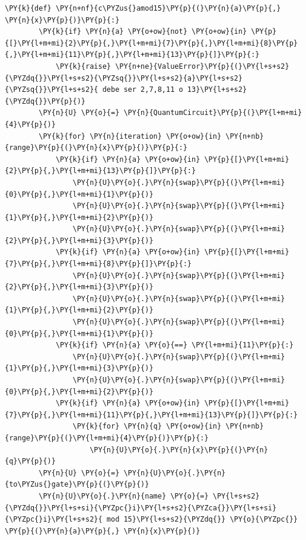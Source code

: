  \begin{tcolorbox}[breakable, size=fbox, boxrule=1pt, pad at break*=1mm,colback=cellbackground, colframe=cellborder]
    \begin{Verbatim}[commandchars=\\\{\}]
    \PY{k}{def} \PY{n+nf}{c\PYZus{}amod15}\PY{p}{(}\PY{n}{a}\PY{p}{,} \PY{n}{x}\PY{p}{)}\PY{p}{:}
        \PY{k}{if} \PY{n}{a} \PY{o+ow}{not} \PY{o+ow}{in} \PY{p}{[}\PY{l+m+mi}{2}\PY{p}{,}\PY{l+m+mi}{7}\PY{p}{,}\PY{l+m+mi}{8}\PY{p}{,}\PY{l+m+mi}{11}\PY{p}{,}\PY{l+m+mi}{13}\PY{p}{]}\PY{p}{:}
            \PY{k}{raise} \PY{n+ne}{ValueError}\PY{p}{(}\PY{l+s+s2}{\PYZdq{}}\PY{l+s+s2}{\PYZsq{}}\PY{l+s+s2}{a}\PY{l+s+s2}{\PYZsq{}}\PY{l+s+s2}{ debe ser 2,7,8,11 o 13}\PY{l+s+s2}{\PYZdq{}}\PY{p}{)}
        \PY{n}{U} \PY{o}{=} \PY{n}{QuantumCircuit}\PY{p}{(}\PY{l+m+mi}{4}\PY{p}{)}        
        \PY{k}{for} \PY{n}{iteration} \PY{o+ow}{in} \PY{n+nb}{range}\PY{p}{(}\PY{n}{x}\PY{p}{)}\PY{p}{:}
            \PY{k}{if} \PY{n}{a} \PY{o+ow}{in} \PY{p}{[}\PY{l+m+mi}{2}\PY{p}{,}\PY{l+m+mi}{13}\PY{p}{]}\PY{p}{:}
                \PY{n}{U}\PY{o}{.}\PY{n}{swap}\PY{p}{(}\PY{l+m+mi}{0}\PY{p}{,}\PY{l+m+mi}{1}\PY{p}{)}
                \PY{n}{U}\PY{o}{.}\PY{n}{swap}\PY{p}{(}\PY{l+m+mi}{1}\PY{p}{,}\PY{l+m+mi}{2}\PY{p}{)}
                \PY{n}{U}\PY{o}{.}\PY{n}{swap}\PY{p}{(}\PY{l+m+mi}{2}\PY{p}{,}\PY{l+m+mi}{3}\PY{p}{)}
            \PY{k}{if} \PY{n}{a} \PY{o+ow}{in} \PY{p}{[}\PY{l+m+mi}{7}\PY{p}{,}\PY{l+m+mi}{8}\PY{p}{]}\PY{p}{:}
                \PY{n}{U}\PY{o}{.}\PY{n}{swap}\PY{p}{(}\PY{l+m+mi}{2}\PY{p}{,}\PY{l+m+mi}{3}\PY{p}{)}
                \PY{n}{U}\PY{o}{.}\PY{n}{swap}\PY{p}{(}\PY{l+m+mi}{1}\PY{p}{,}\PY{l+m+mi}{2}\PY{p}{)}
                \PY{n}{U}\PY{o}{.}\PY{n}{swap}\PY{p}{(}\PY{l+m+mi}{0}\PY{p}{,}\PY{l+m+mi}{1}\PY{p}{)}
            \PY{k}{if} \PY{n}{a} \PY{o}{==} \PY{l+m+mi}{11}\PY{p}{:}
                \PY{n}{U}\PY{o}{.}\PY{n}{swap}\PY{p}{(}\PY{l+m+mi}{1}\PY{p}{,}\PY{l+m+mi}{3}\PY{p}{)}
                \PY{n}{U}\PY{o}{.}\PY{n}{swap}\PY{p}{(}\PY{l+m+mi}{0}\PY{p}{,}\PY{l+m+mi}{2}\PY{p}{)}
            \PY{k}{if} \PY{n}{a} \PY{o+ow}{in} \PY{p}{[}\PY{l+m+mi}{7}\PY{p}{,}\PY{l+m+mi}{11}\PY{p}{,}\PY{l+m+mi}{13}\PY{p}{]}\PY{p}{:}
                \PY{k}{for} \PY{n}{q} \PY{o+ow}{in} \PY{n+nb}{range}\PY{p}{(}\PY{l+m+mi}{4}\PY{p}{)}\PY{p}{:}
                    \PY{n}{U}\PY{o}{.}\PY{n}{x}\PY{p}{(}\PY{n}{q}\PY{p}{)}
        \PY{n}{U} \PY{o}{=} \PY{n}{U}\PY{o}{.}\PY{n}{to\PYZus{}gate}\PY{p}{(}\PY{p}{)}
        \PY{n}{U}\PY{o}{.}\PY{n}{name} \PY{o}{=} \PY{l+s+s2}{\PYZdq{}}\PY{l+s+si}{\PYZpc{}i}\PY{l+s+s2}{\PYZca{}}\PY{l+s+si}{\PYZpc{}i}\PY{l+s+s2}{ mod 15}\PY{l+s+s2}{\PYZdq{}} \PY{o}{\PYZpc{}} \PY{p}{(}\PY{n}{a}\PY{p}{,} \PY{n}{x}\PY{p}{)}

\end{Verbatim}
\end{tcolorbox}
